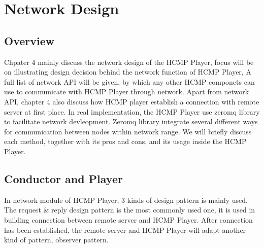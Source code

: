 
\chapter{Network Design} %



\ifpdf
    \graphicspath{{X/figures/PNG/}{X/figures/PDF/}{X/figures/}}
\else
    \graphicspath{{X/figures/EPS/}{X/figures/}}
\fi


\section{Overview}

Chpater 4 mainly discuss the network design of the HCMP Player,  
focus will be on illustrating design decision behind the network function of    
HCMP Player, A full list of network API will be given, by which any other 
HCMP componets can use to communicate with HCMP Player through network.   
Apart from network API, chapter 4 also discuss how HCMP player establish a 
connection with remote server at first place. In real implementation, the HCMP Player 
use zeromq library to facilitate network devleopment. Zeromq library 
integrate several
different ways for communication between nodes within network range.
We will briefly discuss each method, together with its pros and cons, and 
its usage inside the HCMP Player.

\section{Conductor and Player}
In network module of HCMP Player, 3 kinds of design pattern is mainly used. The 
request \& reply design pattern is the most commonly used one, it is used in 
building connection between remote server
and HCMP Player. After connection has been established, the remote server and
HCMP Player will adapt another kind of pattern, observer pattern. 

